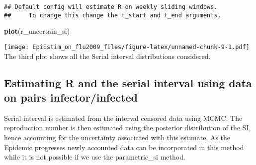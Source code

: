 \documentclass[
]{article}
\newenvironment{Shaded}{\begin{snugshade}}{\end{snugshade}}
\newcommand{\AttributeTok}[1]{\textcolor[rgb]{0.13,0.29,0.53}{#1}}
\newcommand{\CommentTok}[1]{\textcolor[rgb]{0.56,0.35,0.01}{\textit{#1}}}
\newcommand{\DecValTok}[1]{\textcolor[rgb]{0.00,0.00,0.81}{#1}}
\newcommand{\FunctionTok}[1]{\textcolor[rgb]{0.13,0.29,0.53}{\textbf{#1}}}
\newcommand{\NormalTok}[1]{#1}
\newcommand{\OtherTok}[1]{\textcolor[rgb]{0.56,0.35,0.01}{#1}}
\newcommand{\SpecialCharTok}[1]{\textcolor[rgb]{0.81,0.36,0.00}{\textbf{#1}}}
\newcommand{\StringTok}[1]{\textcolor[rgb]{0.31,0.60,0.02}{#1}}
\begin{document}
\begin{verbatim}
## Default config will estimate R on weekly sliding windows.
##     To change this change the t_start and t_end arguments.
\end{verbatim}

\begin{Shaded}
\begin{Highlighting}[]
\FunctionTok{plot}\NormalTok{(r\_uncertain\_si)}
\end{Highlighting}
\end{Shaded}

\texttt{[image: EpiEstim\_on\_flu2009\_files/figure-latex/unnamed-chunk-9-1.pdf]}
The third plot shows all the Serial interval distributions considered.

\hypertarget{estimating-r-and-the-serial-interval-using-data-on-pairs-infectorinfected}{%
\subsection{Estimating R and the serial interval using data on pairs
infector/infected}\label{estimating-r-and-the-serial-interval-using-data-on-pairs-infectorinfected}}

Serial interval is estimated from the interval censored data using MCMC.
The reproduction number is then estimated using the posterior
distribution of the SI, hence accounting for the uncertainty associated
with this estimate. As the Epidemic progresses newly accounted data can
be incorporated in this method while it is not possible if we use the
parametric\_si method.

\begin{Shaded}
\end{Shaded}
\end{document}

